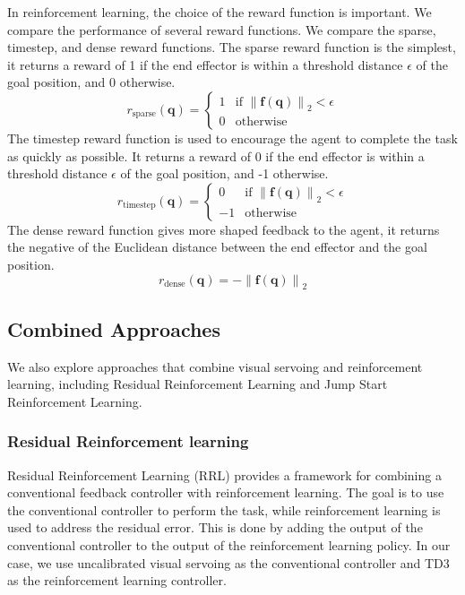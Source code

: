 \documentclass[letterpaper, 10 pt, conference]{ieeeconf}  %
\newcommand\norm[1]{\left\lVert#1\right\rVert}
\begin{document}
In reinforcement learning, the choice of the reward function is important.
We compare the performance of several reward functions. We compare the sparse,
timestep, and dense reward functions.
The sparse reward function is the simplest, it returns a reward of 1 if the
end effector is within a threshold distance $\epsilon$ of the goal position,
and 0 otherwise.
\begin{equation} \label{eq:sparse}
    r_{\text{sparse}}(\mathbf{q}) = \begin{cases}
        1 & \text{if } \norm{\mathbf{f}(\mathbf{q})}_2 < \epsilon \\
        0 & \text{otherwise}
    \end{cases}
\end{equation}
The timestep reward function is used to encourage the agent to complete the
task as quickly as possible. It returns a reward of 0 if the end effector is
within a threshold distance $\epsilon$ of the goal position, and -1 otherwise.
\begin{equation} \label{eq:timestep}
    r_{\text{timestep}}(\mathbf{q}) = \begin{cases}
        0 & \text{if } \norm{\mathbf{f}(\mathbf{q})}_2 < \epsilon \\
        -1 & \text{otherwise}
    \end{cases}
\end{equation}
The dense reward function gives more shaped feedback to the agent, it returns the
negative of the Euclidean distance between the end effector and the goal position.
\begin{equation} \label{eq:dense}
    r_{\text{dense}}(\mathbf{q}) = -\norm{\mathbf{f}(\mathbf{q})}_2
\end{equation}

\subsection{Combined Approaches}

We also explore approaches that combine visual servoing and reinforcement
learning, including Residual Reinforcement Learning and Jump Start Reinforcement
Learning.

\subsubsection{Residual Reinforcement learning}

Residual Reinforcement Learning (RRL) provides a framework for combining a conventional
feedback controller with reinforcement learning. The goal is to use the conventional
controller to perform the task, while reinforcement learning is used to address the
residual error. \cite{Johannink2018} This is done by adding the output of the
conventional controller to the output of the reinforcement learning policy. In our case,
we use uncalibrated visual servoing as the conventional controller and TD3 as the
reinforcement learning controller.
\end{document}
